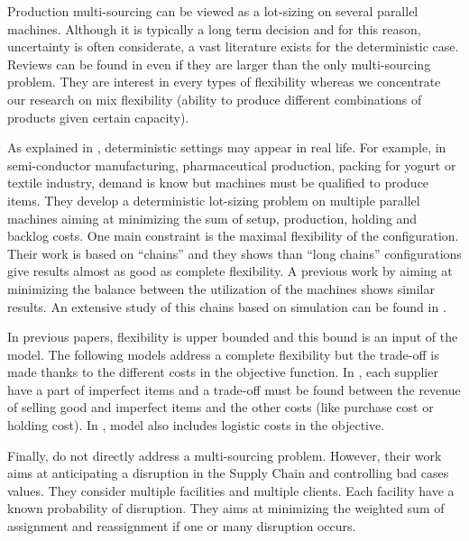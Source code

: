 Production multi-sourcing can be viewed as a lot-sizing on several parallel machines.
Although it is typically a long term decision and for this reason, uncertainty is often considerate, a vast literature exists for the deterministic case.
Reviews can be found in \cite{Sethi1990,Koste1999,Stevenson2007} even if they are larger than the only multi-sourcing problem.
They are interest in every types of flexibility whereas we concentrate our research on mix flexibility (ability to produce different combinations of products given certain capacity).


As explained in \cite{Fiorotto2018}, deterministic settings may appear in real life.
For example, in semi-conductor manufacturing, pharmaceutical production, packing for yogurt or textile industry, demand is know but machines must be qualified to produce items.
They develop a deterministic lot-sizing problem on multiple parallel machines aiming at minimizing the sum of setup, production, holding and backlog costs.
One main constraint is the maximal flexibility of the configuration.
Their work is based on ``chains'' and they shows than ``long chains'' configurations give results almost as good as complete flexibility.
A previous work by \cite{Ignizio2009} aiming at minimizing the balance between the utilization of the machines shows similar results.
An extensive study of this chains based on simulation can be found in \cite{Muriel2006}.


In previous papers, flexibility is upper bounded and this bound is an input of the model.
The following models address a complete flexibility but the trade-off is made thanks to the different costs in the objective function.
In \cite{Rezaei2008}, each supplier have a part of imperfect items and a trade-off must be found between the revenue of selling good and imperfect items and the other costs (like purchase cost or holding cost).
In \cite{Woarawichai2017}, model also includes logistic costs in the objective.


Finally, \cite{Snyder2006b} do not directly address a multi-sourcing problem.
However, their work aims at anticipating a disruption in the Supply Chain and controlling bad cases values.
They consider multiple facilities and multiple clients.
Each facility have a known probability of disruption.
They aims at minimizing the weighted sum of assignment and reassignment if one or many disruption occurs.




